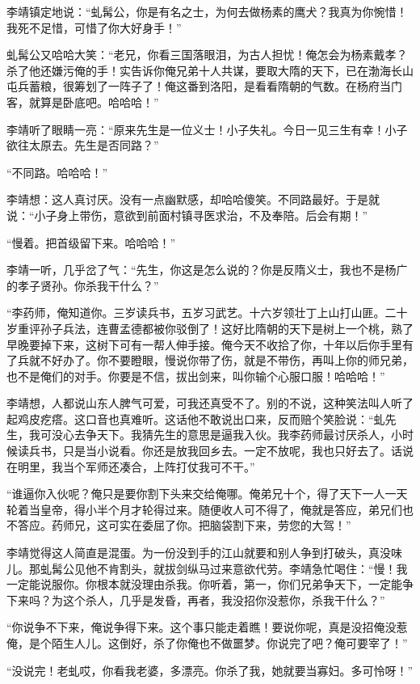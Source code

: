 李靖镇定地说：“虬髯公，你是有名之士，为何去做杨素的鹰犬？我真为你惋惜！我死不足惜，可惜了你大好身手！”

虬髯公又哈哈大笑：“老兄，你看三国落眼泪，为古人担忧！俺怎会为杨素戴孝？杀了他还嫌污俺的手！实告诉你俺兄弟十人共谋，要取大隋的天下，已在渤海长山屯兵蓄粮，很筹划了一阵子了！俺这番到洛阳，是看看隋朝的气数。在杨府当门客，就算是卧底吧。哈哈哈！”

李靖听了眼睛一亮：“原来先生是一位义士！小子失礼。今日一见三生有幸！小子欲往太原去。先生是否同路？”

“不同路。哈哈哈！”

李靖想：这人真讨厌。没有一点幽默感，却哈哈傻笑。不同路最好。于是就说：“小子身上带伤，意欲到前面村镇寻医求治，不及奉陪。后会有期！”

“慢着。把首级留下来。哈哈哈！”

李靖一听，几乎岔了气：“先生，你这是怎么说的？你是反隋义士，我也不是杨广的孝子贤孙。你杀我干什么？”

“李药师，俺知道你。三岁读兵书，五岁习武艺。十六岁领壮丁上山打山匪。二十岁重评孙子兵法，连曹孟德都被你驳倒了！这好比隋朝的天下是树上一个桃，熟了早晚要掉下来，这树下可有一帮人伸手接。俺今天不收拾了你，十年以后你手里有了兵就不好办了。你不要瞪眼，慢说你带了伤，就是不带伤，再叫上你的师兄弟，也不是俺们的对手。你要是不信，拔出剑来，叫你输个心服口服！哈哈哈！”

李靖想，人都说山东人脾气可爱，可我还真受不了。别的不说，这种笑法叫人听了起鸡皮疙瘩。这口音也真难听。这话他不敢说出口来，反而赔个笑脸说：“虬先生，我可没心去争天下。我猜先生的意思是逼我入伙。我李药师最讨厌杀人，小时候读兵书，只是当小说看。你还是放我回乡去。一定不放呢，我也只好去了。话说在明里，我当个军师还凑合，上阵打仗我可不干。”

“谁逼你入伙呢？俺只是要你割下头来交给俺哪。俺弟兄十个，得了天下一人一天轮着当皇帝，得小半个月才轮得过来。随便收人可不得了，俺就是答应，弟兄们也不答应。药师兄，这可实在委屈了你。把脑袋割下来，劳您的大驾！”

李靖觉得这人简直是混蛋。为一份没到手的江山就要和别人争到打破头，真没味儿。那虬髯公见他不肯割头，就拔剑纵马过来意欲代劳。李靖急忙喝住：“慢！我一定能说服你。你根本就没理由杀我。你听着，第一，你们兄弟争天下，一定能争下来吗？为这个杀人，几乎是发昏，再者，我没招你没惹你，杀我干什么？”

“你说争不下来，俺说争得下来。这个事只能走着瞧！要说你呢，真是没招俺没惹俺，是个陌生人儿。这倒好，杀了你俺也不做噩梦。你说完了吧？俺可要宰了！”

“没说完！老虬哎，你看我老婆，多漂亮。你杀了我，她就要当寡妇。多可怜呀！”

